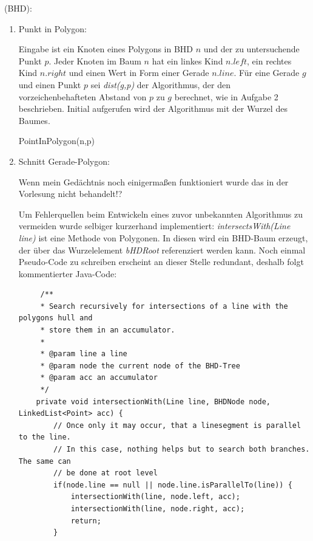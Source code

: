 \documentclass[a4paper, titlepage=false, parskip=full-, 10pt]{scrartcl}
\newcounter{tasknbr}
\newenvironment{task}[1]{{\bf Aufgabe \arabic {tasknbr}\stepcounter{tasknbr}} (#1):\begin{enumerate}}{\end{enumerate}}
\newcommand{\subtask}[1]{\item[#1)]}
\begin{document}
\begin{task}{BHD}
\subtask{a}
Punkt in Polygon:

Eingabe ist ein Knoten eines Polygons in BHD $n$ und der zu untersuchende Punkt $p$. Jeder Knoten im Baum $n$ hat ein linkes Kind $n.left$, ein rechtes Kind $n.right$ und einen Wert in Form einer Gerade $n.line$. Für eine Gerade $g$ und einen Punkt $p$ sei \emph{dist(g,p)} der Algorithmus, der den vorzeichenbehafteten Abstand von $p$ zu $g$ berechnet, wie in Aufgabe 2 beschrieben. Initial aufgerufen wird der Algorithmus mit der Wurzel des Baumes.
\begin{algorithm}
\caption{PointInPolygon(n,p)}
\begin{algorithmic}
\ENDIF
{}
\ENDIF
{}
\ENDIF
{}
\ENDIF
{}
\ENDIF
{}
\ENDIF
{}
\end{algorithmic}
\end{algorithm}

\subtask{b}
Schnitt Gerade-Polygon:

Wenn mein Gedächtnis noch einigermaßen funktioniert wurde das in der Vorlesung nicht behandelt!?

Um Fehlerquellen beim Entwickeln eines zuvor unbekannten Algorithmus zu vermeiden wurde selbiger kurzerhand implementiert: \emph{intersectsWith(Line line)} ist eine Methode von Polygonen. In diesen wird ein BHD-Baum erzeugt, der über das Wurzelelement \emph{bHDRoot} referenziert werden kann. Noch einmal Pseudo-Code zu schreiben erscheint an dieser Stelle redundant, deshalb folgt kommentierter Java-Code:
\newpage
\lstset{language=Java}
\begin{lstlisting}
     /**
     * Search recursively for intersections of a line with the polygons hull and
     * store them in an accumulator.
     * 
     * @param line a line
     * @param node the current node of the BHD-Tree
     * @param acc an accumulator
     */
    private void intersectionWith(Line line, BHDNode node, LinkedList<Point> acc) {
        // Once only it may occur, that a linesegment is parallel to the line.
        // In this case, nothing helps but to search both branches. The same can
        // be done at root level
        if(node.line == null || node.line.isParallelTo(line)) {
            intersectionWith(line, node.left, acc);
            intersectionWith(line, node.right, acc);
            return;
        }


\end{lstlisting}
\end{task}
\end{document}
